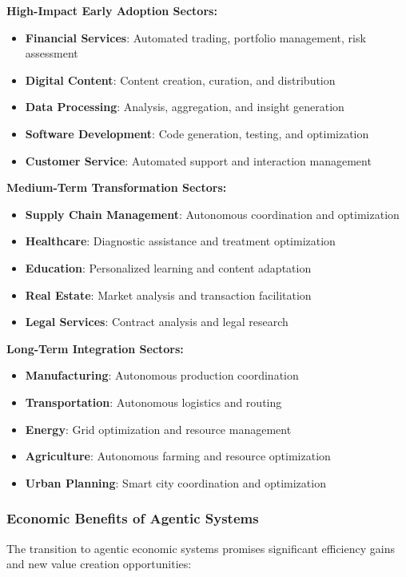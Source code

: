 \documentclass[12pt,a4paper]{article}
\begin{document}
\textbf{High-Impact Early Adoption Sectors:}
\begin{itemize}
\item \textbf{Financial Services}: Automated trading, portfolio management, risk assessment
\item \textbf{Digital Content}: Content creation, curation, and distribution
\item \textbf{Data Processing}: Analysis, aggregation, and insight generation
\item \textbf{Software Development}: Code generation, testing, and optimization
\item \textbf{Customer Service}: Automated support and interaction management
\end{itemize}

\textbf{Medium-Term Transformation Sectors:}
\begin{itemize}
\item \textbf{Supply Chain Management}: Autonomous coordination and optimization
\item \textbf{Healthcare}: Diagnostic assistance and treatment optimization
\item \textbf{Education}: Personalized learning and content adaptation
\item \textbf{Real Estate}: Market analysis and transaction facilitation
\item \textbf{Legal Services}: Contract analysis and legal research
\end{itemize}

\textbf{Long-Term Integration Sectors:}
\begin{itemize}
\item \textbf{Manufacturing}: Autonomous production coordination
\item \textbf{Transportation}: Autonomous logistics and routing
\item \textbf{Energy}: Grid optimization and resource management
\item \textbf{Agriculture}: Autonomous farming and resource optimization
\item \textbf{Urban Planning}: Smart city coordination and optimization
\end{itemize}

\subsubsection{Economic Benefits of Agentic Systems}

The transition to agentic economic systems promises significant efficiency gains and new value creation opportunities:
\end{document}
